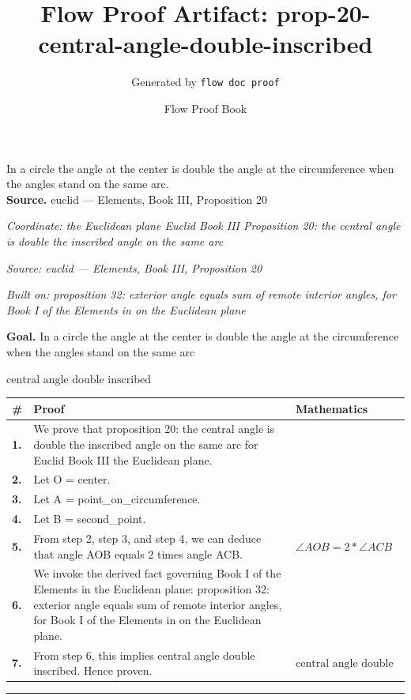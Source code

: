 \documentclass[11pt]{article}
\title{Flow Proof Artifact: prop-20-central-angle-double-inscribed}
\author{Generated by \texttt{flow doc proof}}
\date{Flow Proof Book}
\theoremstyle{definition}
\begin{document}
\maketitle
In a circle the angle at the center is double the angle at the circumference when the angles stand on the same arc.\\[0.5em]
\textbf{Source.} euclid — Elements, Book III, Proposition 20\\[0.5em]
\bigskip
{}\par
\smallskip\noindent\textit{Coordinate: the Euclidean plane \cdot Euclid Book III \cdot Proposition 20: the central angle is double the inscribed angle on the same arc}\par
\smallskip\noindent\textit{Source: euclid — Elements, Book III, Proposition 20}\par
\smallskip\noindent\textit{Built on: proposition 32: exterior angle equals sum of remote interior angles, for Book I of the Elements in on the Euclidean plane}\par
\medskip
\noindent\textbf{Goal.} In a circle the angle at the center is double the angle at the circumference when the angles stand on the same arc\par
\noindent$\displaystyle \text{central angle double inscribed}$\par
\medskip
\noindent
\begin{tabular}{@{} >{\raggedright\arraybackslash}p{} >{\raggedright\arraybackslash}p{} >{\raggedleft\arraybackslash}p{} @{}}
\textbf{\#} & \textbf{Proof} & \textbf{Mathematics} \\
\midrule
\textbf{1.} & We prove that proposition 20: the central angle is double the inscribed angle on the same arc for Euclid Book III the Euclidean plane. & \\[0.45em]
\textbf{2.} & Let O = center. & \\[0.45em]
\textbf{3.} & Let A = point\_on\_circumference. & \\[0.45em]
\textbf{4.} & Let B = second\_point. & \\[0.45em]
\textbf{5.} & From step 2, step 3, and step 4, we can deduce that angle AOB equals 2 times angle ACB. & $\displaystyle \angle AOB = 2 * \angle ACB$ \\[0.45em]
\textbf{6.} & We invoke the derived fact governing Book I of the Elements in the Euclidean plane: proposition 32: exterior angle equals sum of remote interior angles, for Book I of the Elements in on the Euclidean plane. & \\[0.45em]
\textbf{7.} & From step 6, this implies central angle double inscribed. Hence proven. & $\displaystyle \text{central angle double inscribed}$ \\[0.45em]
\bottomrule
\end{tabular}
\label{thm:Geometry-Euclid Book III-proposition_20_the_central_angle_is_double_the_inscribed_angle_on_the_same_arc}
\par\medskip\hrule
\end{document}
